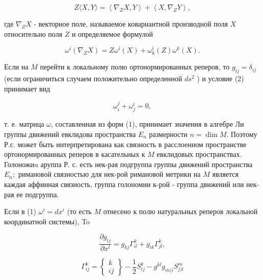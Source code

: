 \documentclass[10pt]{article}
\begin{document}
\[

Z\langle X, Y\rangle=\left\langle\nabla_{Z} X, Y\right\rangle+\left\langle X, \nabla_{Z} Y\right\rangle,

\]



где $\nabla_{Z} X$ - векторное поле, называемое ковариантной производной поля $X$ относительно поля $Z$ и определяемое формулой



\[

\omega^{i}\left(\nabla_{Z} X\right)=Z \omega^{i}(X)+\omega_{k}^{i}(Z) \omega^{k}(X) .

\]



Если на $M$ перейти к локальному полю ортонормированных реперов, то $g_{i j}=\delta_{i j}$ (если ограничиться случаем положительно определенной $d s^{2}$ ) и условие (2) принимает вид



\[

\omega_{i}^{j}+\omega_{j}^{i}=0,

\]



т. е. матрица $\omega$, составленная из форм (1), принимает значения в алгебре Ли группы движений евклидова пространства $E_{n}$ размерности $n=\operatorname{dim} M$. Поэтому Р.с. может быть интерпретирована как связность в расслоенном пространстве ортонормированных реперов в касательных к $M$ евклидовых пространствах. Голоножиu аруппа Р. с. есть нек-рая подгруппа группы движений пространства $E_{n} ;$ римановой связностью для нек-рой римановой метрики на $M$ является каждая аффинная связность, группа голономии к-рой - группа движений или нек-рая ее подгруппа.



Если в (1) $\omega^{i}=d x^{i}$ (то есть $M$ отнесено к полю натуральных реперов локальной координатной системы), To



\[

\frac{\partial g_{i j}}{\partial x^{l}}=g_{k j} \Gamma_{i l}^{k}+g_{i k} \Gamma_{j l}^{k},

\]



\[

\Gamma_{i j}^{k}=\left\{\begin{array}{l}

k \\

i j

\end{array}\right\}-\frac{1}{2} S_{i j}^{k}-g^{k l} g_{m(i} S_{j) l}^{m}

\]
\end{document}
